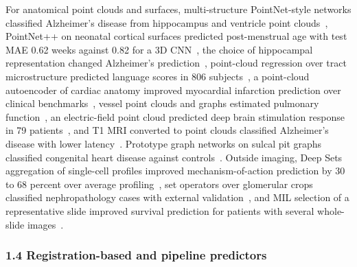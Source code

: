 \documentclass[journal,onecolumn]{IEEEtran}
\begin{document}
For anatomical point clouds and surfaces, multi-structure PointNet-style networks classified Alzheimer's disease from hippocampus and ventricle point clouds~\cite{GutierrezBecker2018MSPNet}, PointNet++ on neonatal cortical surfaces predicted post-menstrual age with test MAE 0.62 weeks against 0.82 for a 3D CNN~\cite{Vosylius2020NeonatalSurface}, the choice of hippocampal representation changed Alzheimer's prediction~\cite{Sarasua2022Hippocampal}, point-cloud regression over tract microstructure predicted language scores in 806 subjects~\cite{Chen2024TractGeoNet}, a point-cloud autoencoder of cardiac anatomy improved myocardial infarction prediction over clinical benchmarks~\cite{Beetz2025PointVAE}, vessel point clouds and graphs estimated pulmonary function~\cite{Jia2024PFT}, an electric-field point cloud predicted deep brain stimulation response in 79 patients~\cite{Liu2026Three}, and T1 MRI converted to point clouds classified Alzheimer's disease with lower latency~\cite{Islam2026NeuroAPS}. Prototype graph networks on sulcal pit graphs classified congenital heart disease against controls~\cite{Kwon2025Graph}. Outside imaging, Deep Sets aggregation of single-cell profiles improved mechanism-of-action prediction by 30 to 68 percent over average profiling~\cite{vanDijk2024CytoSummaryNet}, set operators over glomerular crops classified nephropathology cases with external validation~\cite{Zare2025PICASO}, and MIL selection of a representative slide improved survival prediction for patients with several whole-slide images~\cite{Verdelho2025MIL}.

\subsubsection{1.4 Registration-based and pipeline predictors}
\end{document}
